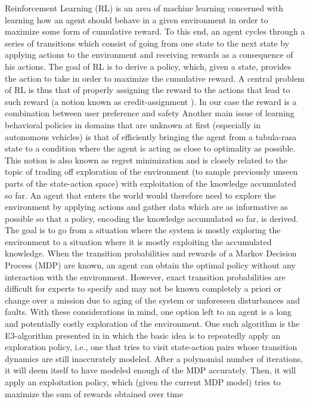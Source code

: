 Reinforcement Learning (RL) is an area of machine learning concerned with learning how an agent should behave in a given environment in order to maximize some form of cumulative reward. To this end, an agent cycles through a series of transitions which consist of going from one state to the next state by applying actions to the environment and receiving rewards as a consequence of his actions. The goal of RL is to derive a policy, which, given a state, provides the action to take in order to maximize the cumulative reward.
A central problem of RL is thus that of properly assigning the reward to the actions that lead to such reward (a notion known as credit-assignment \cite{kaelbling1996reinforcement, sutton1998reinforcement}). In our case the reward is a combination between user preference and safety 
Another main issue of learning behavioral policies in domains that are unknown at first (especially in autonomous vehicles) is that of efficiently bringing the agent from a tabula-rasa state to a condition where the agent is acting as close to optimality as possible. This notion is also known as regret minimization \cite{kaelbling1996reinforcement, sutton1998reinforcement} and is closely related to the topic of trading off exploration of the environment (to sample previously unseen parts of the state-action space) with exploitation of the knowledge accumulated so far. 
An agent that enters the world would therefore need to explore the environment by applying actions and gather data which are as informative as possible so that a policy, encoding the knowledge accumulated so far, is derived. The goal is to go from a situation where the system is mostly exploring the environment to a situation where it is mostly exploiting the accumulated knowledge. 
When the transition probabilities and rewards of a Markov Decision Process (MDP) are known, an agent can obtain the optimal policy without any interaction with the environment. However, exact transition probabilities are difficult for experts to specify and may not be known completely a priori or change over a mission due to aging of the system or unforeseen disturbances and faults. With these considerations in mind, one option left to an agent is a long and potentially costly exploration of the environment. One such algorithm is the E3-algorithm presented in \cite{kearns2002near} in which the basic idea is to repeatedly apply an exploration policy, i.e., one that tries to visit state-action pairs whose transition dynamics are still inaccurately modeled. After a polynomial number of iterations, it will deem itself to have modeled enough of the MDP accurately. Then, it will apply an exploitation policy, which (given the current MDP model) tries to maximize the sum of rewards obtained over time 
